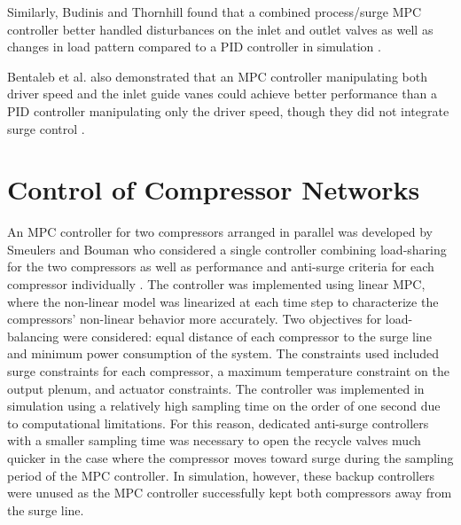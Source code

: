 Similarly, Budinis and Thornhill found that a combined process/surge MPC controller better handled disturbances on the inlet and outlet valves as well as changes in load pattern compared to a PID controller in simulation \cite{Budinis2015}.

Bentaleb et al. also demonstrated that an MPC controller manipulating both driver speed and the inlet guide vanes could achieve better performance than a PID controller manipulating only the driver speed, though they did not integrate surge control \cite{Bentaleb2014}.


\section{Control of Compressor Networks}

An MPC controller for two compressors arranged in parallel was developed by Smeulers and Bouman who considered a single controller combining load-sharing for the two compressors as well as performance and anti-surge criteria for each compressor individually \cite{Smeulers1999}. 
The controller was implemented using linear MPC, where the non-linear model was linearized at each time step to characterize the compressors' non-linear behavior more accurately.
Two objectives for load-balancing were considered: equal distance of each compressor to the surge line and minimum power consumption of the system. 
The constraints used included surge constraints for each compressor, a maximum temperature constraint on the output plenum, and actuator constraints.
The controller was implemented in simulation using a relatively high sampling time on the order of one second due to computational limitations. 
For this reason, dedicated anti-surge controllers with a smaller sampling time was necessary to open the recycle valves much quicker in the case where the compressor moves toward surge during the sampling period of the MPC controller. 
In simulation, however, these backup controllers were unused as the MPC controller successfully kept both compressors away from the surge line.

